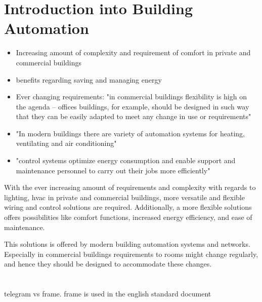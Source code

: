 
\section{Introduction into Building Automation}
	\begin{itemize}
		\item Increasing amount of complexity and requirement of comfort in private and commercial buildings \parencite{Merz2009}

		\item benefits regarding saving and managing energy \parencite{Merz2009}
		\item Ever changing requirements: "in commercial buildings flexibility is high on the agenda -- offices buildings, for example, should be designed in such way that they can be easily adapted to meet any change in use or requirements" \parencite{Merz2009}
		\item "In modern buildings there are variety of automation systems for heating, ventilating and air conditioning" \parencite{Merz2009}
		\item "control systems optimize energy consumption and enable support and maintenance personnel to carry out their jobs more efficiently" \parencite{Merz2009}
		
	\end{itemize}

With the ever increasing amount of requirements and complexity with regards to lighting, \gls{hvac} in private and commercial buildings, more versatile and flexible wiring and control solutions are required. 
Additionally, a more flexible solutions offers possibilities like comfort functions, increased energy efficiency, and ease of maintenance. \parencite{Merz2009}

This solutions is offered by modern building automation systems and networks. Especially in commercial buildings requirements to rooms might change regularly, and hence they should be designed to accommodate these changes. \parencite{Merz2009}

\section{\knx}
	\alert{telegram vs frame. frame is used in the english standard document}
	
